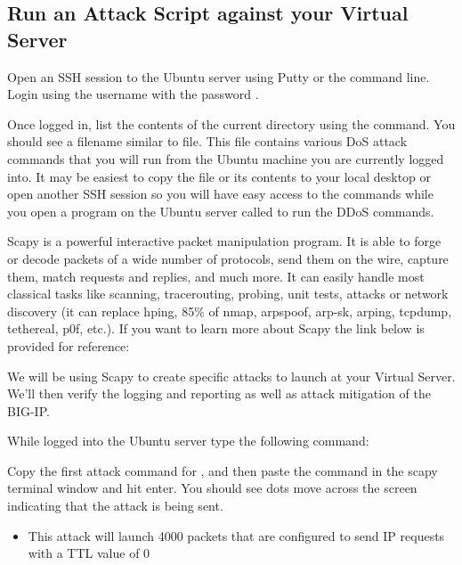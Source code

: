 \documentclass[letterpaper,10pt,english]{sphinxmanual}
\begin{document}
\subsection{Run an Attack Script against your Virtual Server}
\label{\detokenize{class1/module3/lab2:run-an-attack-script-against-your-virtual-server}}\label{\detokenize{class1/module3/lab2::doc}}
Open an SSH session to the Ubuntu server  using Putty
or the command line. Login using the username  with the password
.

Once logged in, list the contents of the current directory using the
 command. You should see a filename similar to
 file. This file contains various DoS
attack commands that you will run from the Ubuntu machine you are
currently logged into. It may be easiest to copy the file or its
contents to your local desktop or open another SSH session so you will
have easy access to the commands while you open a program on the Ubuntu
server called  to run the DDoS commands.

Scapy is a powerful interactive packet manipulation program. It is able
to forge or decode packets of a wide number of protocols, send them on
the wire, capture them, match requests and replies, and much more. It
can easily handle most classical tasks like scanning, tracerouting,
probing, unit tests, attacks or network discovery (it can replace hping,
85\% of nmap, arpspoof, arp-sk, arping, tcpdump, tethereal, p0f, etc.).
If you want to learn more about Scapy the link below is provided for
reference:


We will be using Scapy to create specific attacks to launch at your
Virtual Server. We’ll then verify the logging and reporting as well as
attack mitigation of the BIG-IP.

While logged into the Ubuntu server type the following command:

Copy the first attack command for , and then paste
the command in the scapy terminal window and hit enter. You should see
dots move across the screen indicating that the attack is being sent.

\begin{itemize}
\item {} 
This attack will launch 4000 packets that are configured to send IP
requests with a TTL value of 0

\end{itemize}
\end{document}
